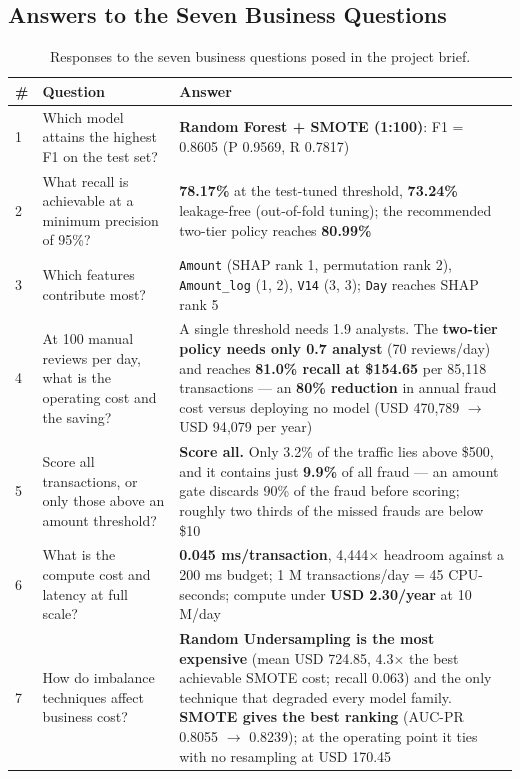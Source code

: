 \subsection{Answers to the Seven Business Questions}

\begin{table}[h!]
\centering
\caption{Responses to the seven business questions posed in the project brief.}
\label{tab:qa}
\small
\begin{tabular}{p{1.1cm}p{6.6cm}p{7.3cm}}
\toprule
\textbf{\#} & \textbf{Question} & \textbf{Answer} \\
\midrule
1 & Which model attains the highest F1 on the test set? & \textbf{Random Forest + SMOTE (1:100)}: F1 = 0.8605 (P 0.9569, R 0.7817) \\
2 & What recall is achievable at a minimum precision of 95\%? & \textbf{78.17\%} at the test-tuned threshold, \textbf{73.24\%} leakage-free (out-of-fold tuning); the recommended two-tier policy reaches \textbf{80.99\%} \\
3 & Which features contribute most? & \texttt{Amount} (SHAP rank 1, permutation rank 2), \texttt{Amount\_log} (1, 2), \texttt{V14} (3, 3); \texttt{Day} reaches SHAP rank 5 \\
4 & At 100 manual reviews per day, what is the operating cost and the saving? & A single threshold needs 1.9 analysts. The \textbf{two-tier policy needs only 0.7 analyst} (70 reviews/day) and reaches \textbf{81.0\% recall at \$154.65} per 85{,}118 transactions --- an \textbf{80\% reduction} in annual fraud cost versus deploying no model (USD 470{,}789 $\rightarrow$ USD 94{,}079 per year) \\
5 & Score all transactions, or only those above an amount threshold? & \textbf{Score all.} Only 3.2\% of the traffic lies above \$500, and it contains just \textbf{9.9\%} of all fraud --- an amount gate discards 90\% of the fraud before scoring; roughly two thirds of the missed frauds are below \$10 \\
6 & What is the compute cost and latency at full scale? & \textbf{0.045 ms/transaction}, 4{,}444$\times$ headroom against a 200 ms budget; 1 M transactions/day = 45 CPU-seconds; compute under \textbf{USD 2.30/year} at 10 M/day \\
7 & How do imbalance techniques affect business cost? & \textbf{Random Undersampling is the most expensive} (mean USD 724.85, 4.3$\times$ the best achievable SMOTE cost; recall 0.063) and the only technique that degraded every model family. \textbf{SMOTE gives the best ranking} (AUC-PR 0.8055 $\rightarrow$ 0.8239); at the operating point it ties with no resampling at USD 170.45 \\
\bottomrule
\end{tabular}
\end{table}
